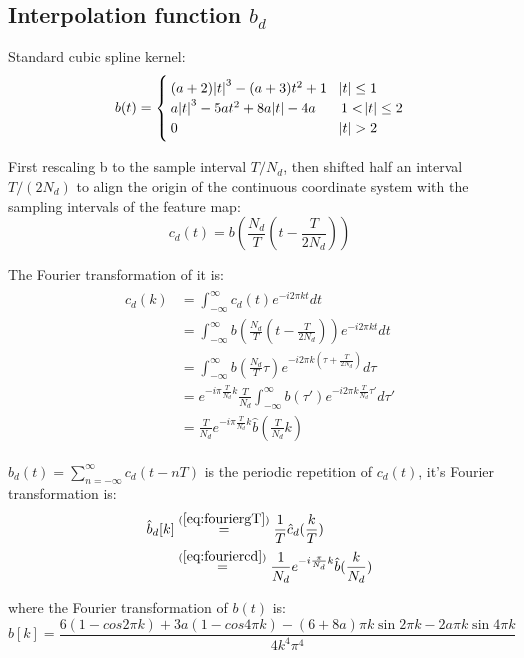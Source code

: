 \documentclass[12pt]{article}
\numberwithin{equation}{section}
\begin{document}
\subsection{Interpolation function $b_d$}
Standard cubic spline kernel: 
\begin{equation}
	b(t)=
	\begin{cases}
		(a+2)\abs{t}^3-(a+3)t^2+1 & \abs{t} \leq 1 \\
		a\abs{t}^3-5at^2+8a\abs{t}-4a & 1 < \abs{t} \leq 2\\
		0	& \abs{t} > 2
    	\end{cases}
\end{equation} \par
First rescaling b to the sample interval $T/N_d$, then shifted half an interval $T/(2N_d)$ to align the origin of the continuous coordinate system with the sampling intervals of the feature map: 
\begin{equation}
	c_d(t)=b(\frac{N_d}{T}(t-\frac{T}{2N_d}))
\end{equation} \par
The Fourier transformation of it is:
\begin{align}\begin{split}\label{eq:fouriercd}
	\hat{c}_d(k) &= \int^{\infty}_{-\infty} c_d(t) e^{-i 2 \pi k t}dt \\
			&= \int^{\infty}_{-\infty} b(\frac{N_d}{T}(t-\frac{T}{2N_d})) e^{-i 2 \pi k t}dt \\
			&= \int^{\infty}_{-\infty} b(\frac{N_d}{T}\tau) e^{-i 2 \pi k (\tau + \frac{T}{2N_d} )} d\tau \\
			&= e^{-i\pi \frac{T}{N_d} k} \frac{T}{N_d} \int^{\infty}_{-\infty} b(\tau')e^{-i2\pi k \frac{T}{N_d} \tau' } d\tau' \\
			&= \frac{T}{N_d} e^{-i\pi \frac{T}{N_d} k} \hat{b}(\frac{T}{N_d}k) 
\end{split}\end{align} \par
$b_d(t)=\sum^{\infty}_{n=-\infty}c_d(t-nT)$  is the periodic repetition of $c_d(t)$, it's Fourier transformation is:
\begin{align}\begin{split}
	\hat{b}_d[k] 
	&\stackrel{(\ref{eq:fouriergT})}{=} \frac{1}{T} \hat{c}_d(\frac{k}{T}) \\
	&\stackrel{(\ref{eq:fouriercd})}{=}\frac{1}{N_d}e^{-i\frac{\pi}{N_d}k} \hat{b}(\frac{k}{N_d})
\end{split}\end{align} \par
where the Fourier transformation of $b(t)$ is:
\begin{equation}
	\hat{b}[k] = \frac{6(1-cos2\pi k)+3a(1-cos4\pi k) - (6+8a) \pi k \sin 2 \pi k - 2a \pi k \sin 4\pi k}{4k^4\pi^4}
\end{equation}
\end{document}
